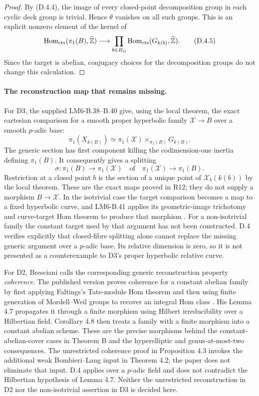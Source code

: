 \begin{proof}
By (D.4.4), the image of every closed-point decomposition
group in each cyclic deck group is trivial. Hence
$\theta$ vanishes on all such groups. This is an explicit
nonzero element of the kernel of
\[
 \operatorname{Hom}_{\mathrm{cts}}(\pi_1(B),\widehat{\mathbb Z})
 \longrightarrow
 \prod_{b\in B_{\mathrm{cl}}}
 \operatorname{Hom}_{\mathrm{cts}}(G_{k(b)},\widehat{\mathbb Z}).
 \tag{D.4.5}
\]
Since the target is abelian, conjugacy choices for the
decomposition groups do not change this calculation.
\end{proof}

\paragraph{The reconstruction map that remains missing.}
For D3, the supplied LM6-B.38--B.40 give, using the local theorem,
the exact cartesian comparison for a smooth proper hyperbolic
family $\mathcal X\to B$ over a smooth $p$-adic base:
\[
 \pi_1(X_{k(B)})\simeq
 \pi_1(\mathcal X)\times_{\pi_1(B)}G_{k(B)}.
 \tag{D.4.6}
\]
The generic section has first component killing the
codimension-one inertia defining $\pi_1(B)$. It consequently
gives a splitting
\[
 \sigma:\pi_1(B)\longrightarrow\pi_1(\mathcal X)
 \quad\text{of}\quad
 \pi_1(\mathcal X)\longrightarrow\pi_1(B).
 \tag{D.4.7}
\]
Restriction at a closed point $b$ is the section of a unique
point of $\mathcal X_b(k(b))$ by the local theorem. These are
the exact maps proved in R12; they do not supply a morphism
$B\to\mathcal X$. In the isotrivial case the target comparison
becomes a map to a fixed hyperbolic curve, and LM6-B.41 applies
its geometric-image trichotomy and curve-target Hom theorem
to produce that morphism \cite[B.38--B.42]{AgentLM6}.
For a non-isotrivial family the constant target used by that
argument has not been constructed. D.4 verifies explicitly
that closed-fibre splitting alone cannot replace the missing
generic argument over a $p$-adic base. Its relative dimension
is zero, so it is not presented as a counterexample to D3's
proper hyperbolic relative curve.

For D2, Bresciani calls the corresponding generic reconstruction
property \emph{coherence}. The published version proves
coherence for a constant abelian family by first applying
Faltings's Tate-module Hom theorem and then using finite
generation of Mordell--Weil groups to recover an integral
Hom class \cite[Proposition 4.5]{AgentBrescianiFiniteType}.
His Lemma 4.7 propagates it through a finite morphism using
Hilbert irreducibility over a Hilbertian field. Corollary 4.8
then treats a family with a finite morphism into a constant
abelian scheme. These are the precise morphisms behind the
constant-abelian-cover cases in Theorem B and the
hyperelliptic and genus-at-most-two consequences. The
unrestricted coherence proof in Proposition 4.3 invokes the
additional weak Bombieri--Lang input in Theorem 4.2; the paper
does not eliminate that input. D.4 applies over a $p$-adic
field and does not contradict the Hilbertian hypothesis of
Lemma 4.7. Neither the unrestricted reconstruction in D2
nor the non-isotrivial assertion in D3 is decided here.

